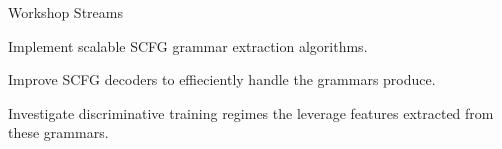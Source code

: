 \documentclass{beamer}
\newenvironment{unpacked_itemize}{
\begin{itemize}
  \setlength{\itemsep}{10pt}
  \setlength{\parskip}{0pt}
  \setlength{\parsep}{0pt}
}{\end{itemize}}
\begin{document}
\begin{frame}[t]{Workshop Streams}
\vspace{0.25in}
\begin{unpacked_itemize}
\item Implement scalable SCFG grammar extraction algorithms.
\item Improve SCFG decoders to effieciently handle the grammars produce.
\item Investigate discriminative training regimes the leverage features extracted from these grammars.
\end{unpacked_itemize}
\end{frame}


%
%


\end{document}
